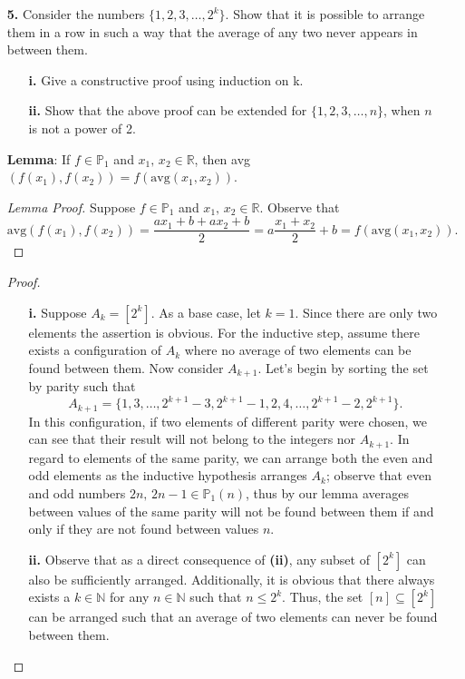 \documentclass[ 12pt ]{article}
\begin{document}
\begin{enumerate}
	\item[\textbf{5.}] Consider the numbers $\{ 1, 2, 3, \hdots, 2^k \}$. Show that it is possible to arrange them in a row in such a way that the average of any two never appears in
		between them.
		\begin{enumerate}
			\item[\textbf{i.}] Give a constructive proof using induction on k.
			\item[\textbf{ii.}] Show that the above proof can be extended for $\{ 1, 2, 3, \hdots, n \}$, when $n$ is not a power of 2.
		\end{enumerate}

		\textbf{Lemma}: If $f \in \mathbb{P}_1$ and $x_1,\, x_2 \in \mathbb{R}$, then avg$( f(x_1), f(x_2) ) = f(\mathrm{avg}(x_1, x_2))$.

		\begin{proof}[Lemma Proof]
			Suppose $f \in \mathbb{P}_1$ and $x_1,\, x_2 \in \mathbb{R}$. Observe that $$\mathrm{avg}(f(x_1), f(x_2)) = \frac{ax_1+b + ax_2+b}{2} = a\frac{x_1+x_2}{2} + b =
			f(\mathrm{avg}(x_1, x_2)).$$
		\end{proof}

		\begin{proof}
			\begin{enumerate}
				\item[\textbf{i.}] Suppose $A_k = [2^k]$. As a base case, let $k = 1$. Since there are only two elements the assertion is obvious. For the inductive step, assume
					there exists a configuration of $A_k$ where no average of two elements can be found between them. Now consider $A_{k+1}$. Let's begin by sorting the set by parity
					such that $$A_{k+1} = \{ 1, 3, \hdots, 2^{k+1} - 3, 2^{k+1} - 1, 2, 4, \hdots, 2^{k+1} - 2, 2^{k+1} \}.$$ In this configuration, if two elements of different parity
					were chosen, we can see that their result will not belong to the integers nor $A_{k+1}$. In regard to elements of the same parity, we can arrange both the even and
					odd elements as the inductive hypothesis arranges $A_k$; observe that even and odd numbers $2n,\, 2n-1 \in \mathbb{P}_1(n)$, thus by our lemma averages between
					values of the same parity will not be found between them if and only if they are not found between values $n$.
				\item[\textbf{ii.}] Observe that as a direct consequence of \textbf{(ii)}, any subset of $[2^k]$ can also be sufficiently arranged. Additionally, it is obvious that
					there always exists a $k \in \mathbb{N}$ for any $n \in \mathbb{N}$ such that $n \leq 2^k$. Thus, the set $[n] \subseteq [2^k]$ can be arranged such that an average
					of two elements can never be found between them.
			\end{enumerate}
		\end{proof}
		\newpage



\end{enumerate}
\end{document}

